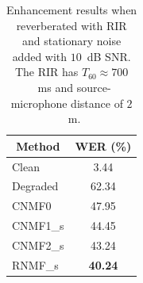 \begin{table}[]
\centering
\begin{tabular}{|l|c|}
\hline
\multicolumn{1}{|c|}{\textbf{Method}} & \textbf{WER (\%)} \\ \hline
Clean                                 & 3.44              \\ \hline
Degraded                              & 62.34             \\ \hline
CNMF0                                 & 47.95             \\ \hline
CNMF1\_s                              & 44.45             \\ \hline
CNMF2\_s                              & 43.24             \\ \hline
RNMF\_s                               & \textbf{40.24}    \\ \hline
\end{tabular}
\caption{Enhancement results when reverberated with RIR  and stationary noise added with $10$~dB SNR. The RIR has $T_{60}\approx 700$~ms and source-microphone distance of $2$~m. }
\end{table}

